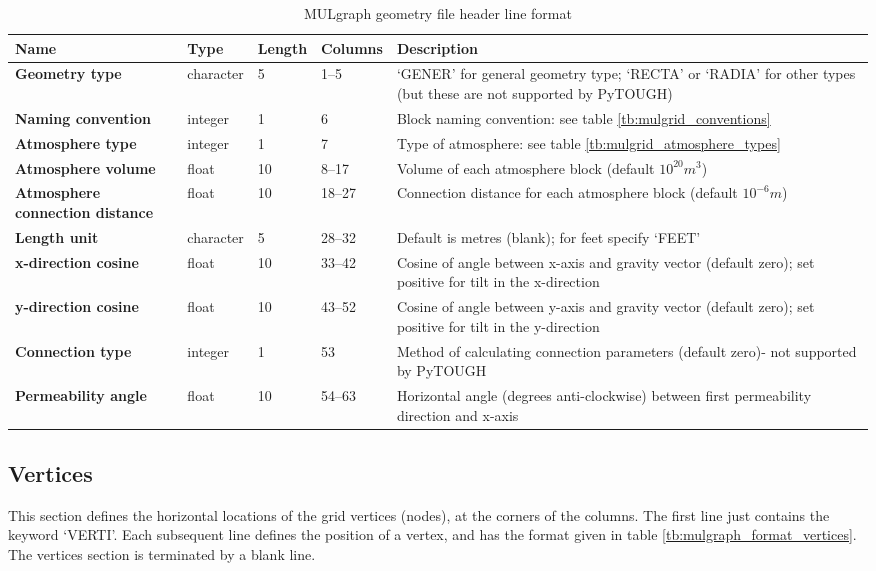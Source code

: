 \begin{table}
  \begin{center}
    \begin{tabular}{|p{20mm}|l|l|l|p{50mm}|}
      \hline
      \textbf{Name} & \textbf{Type} & \textbf{Length} & \textbf{Columns} & \textbf{Description}\\
      \hline
      \textbf{Geometry type} & character & 5 & 1--5 & `GENER' for general geometry type; `RECTA' or `RADIA' for other types (but these are not supported by PyTOUGH)\\
      \hline
      \textbf{Naming convention} & integer & 1 & 6 & Block naming convention: see table \ref{tb:mulgrid_conventions}\\
      \hline
      \textbf{Atmosphere type} & integer & 1 & 7 & Type of atmosphere: see table \ref{tb:mulgrid_atmosphere_types}\\
      \hline
      \textbf{Atmosphere volume} & float & 10 & 8--17 & Volume of each atmosphere block (default $10^{20} m^3$)\\
      \hline
      \textbf{Atmosphere connection distance} & float & 10 & 18--27 & Connection distance for each atmosphere block (default $10^{-6} m$) \\
      \hline
      \textbf{Length unit} & character & 5 & 28--32 & Default is metres (blank); for feet specify `FEET'\\
      \hline
      \textbf{x-direction cosine} & float & 10 & 33--42 & Cosine of angle between x-axis and gravity vector (default zero); set positive for tilt in the x-direction\\
      \hline
      \textbf{y-direction cosine} & float & 10 & 43--52 & Cosine of angle between y-axis and gravity vector (default zero); set positive for tilt in the y-direction\\
      \hline
      \textbf{Connection type} & integer & 1 & 53 & Method of calculating connection parameters (default zero)- not supported by PyTOUGH\\
      \hline
      \textbf{Permeability angle} & float & 10 & 54--63 & Horizontal angle (degrees anti-clockwise) between first permeability direction and x-axis\\
      \hline
    \end{tabular}
    \caption{MULgraph geometry file header line format}
    \label{tb:mulgraph_format_header}
  \end{center}
\end{table}

\subsection{Vertices}
This section defines the horizontal locations of the grid vertices (nodes), at the corners of the columns. The first line just contains the keyword `VERTI'. Each subsequent line defines the position of a vertex, and has the format given in table \ref{tb:mulgraph_format_vertices}. The vertices section is terminated by a blank line.


